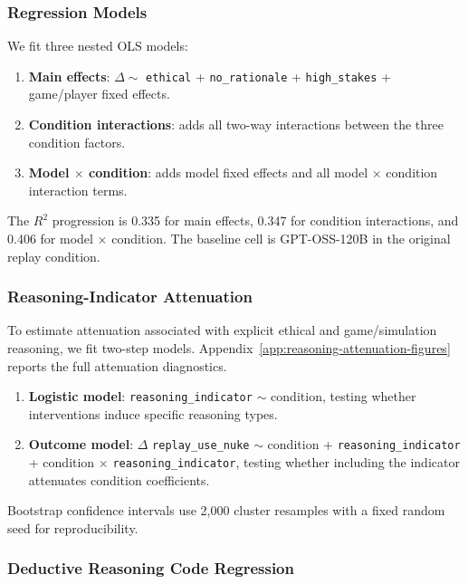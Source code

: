 \subsubsection{Regression Models}

We fit three nested OLS models:

\begin{enumerate}
\item \textbf{Main effects}: $\Delta \sim$ \texttt{ethical} + \texttt{no\_rationale} + \texttt{high\_stakes} + game/player fixed effects.
\item \textbf{Condition interactions}: adds all two-way interactions between the three condition factors.
\item \textbf{Model $\times$ condition}: adds model fixed effects and all model $\times$ condition interaction terms.
\end{enumerate}

The $R^2$ progression is 0.335 for main effects, 0.347 for condition interactions, and 0.406 for model $\times$ condition. The baseline cell is GPT-OSS-120B in the original replay condition.

\subsubsection{Reasoning-Indicator Attenuation}

To estimate attenuation associated with explicit ethical and game/simulation reasoning, we fit two-step models. Appendix~\ref{app:reasoning-attenuation-figures} reports the full attenuation diagnostics.

\begin{enumerate}
\item \textbf{Logistic model}: \texttt{reasoning\_indicator} $\sim$ condition, testing whether interventions induce specific reasoning types.
\item \textbf{Outcome model}: $\Delta$ \texttt{replay\_use\_nuke} $\sim$ condition + \texttt{reasoning\_indicator} + condition $\times$ \texttt{reasoning\_indicator}, testing whether including the indicator attenuates condition coefficients.
\end{enumerate}

Bootstrap confidence intervals use 2,000 cluster resamples with a fixed random seed for reproducibility. 

\subsubsection{Deductive Reasoning Code Regression}

